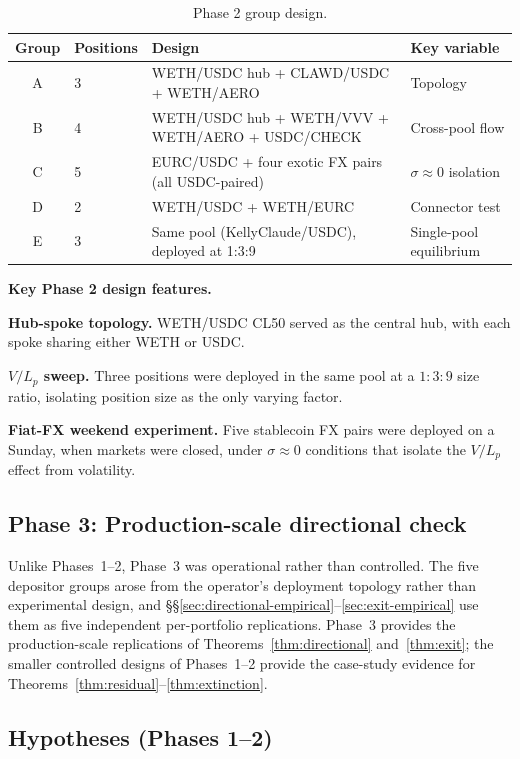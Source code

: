 \documentclass[11pt,a4paper]{article}
\theoremstyle{plain}
\begin{document}
\begin{table}[H]
\centering
\caption{Phase 2 group design.}
\label{tab:phase2-groups}
\setlength{\tabcolsep}{4pt}
\begin{tabular}{@{}clL{9.2cm}l@{}}
\toprule
Group & Positions & Design & Key variable \\
\midrule
A & 3 & WETH/USDC hub + CLAWD/USDC + WETH/AERO & Topology \\
B & 4 & WETH/USDC hub + WETH/VVV + WETH/AERO + USDC/CHECK & Cross-pool flow \\
C & 5 & EURC/USDC + four exotic FX pairs (all USDC-paired) & $\sigma \approx 0$ isolation \\
D & 2 & WETH/USDC + WETH/EURC & Connector test \\
E & 3 & Same pool (KellyClaude/USDC), deployed at 1{:}3{:}9 & Single-pool equilibrium \\
\bottomrule
\end{tabular}
\end{table}

\noindent\textbf{Key Phase 2 design features.}

\textbf{Hub-spoke topology.} WETH/USDC CL50 served as the central hub, with each spoke sharing either WETH or USDC.

\textbf{$V/L_p$ sweep.} Three positions were deployed in the same pool at a $1{:}3{:}9$ size ratio, isolating position size as the only varying factor.

\textbf{Fiat-FX weekend experiment.} Five stablecoin FX pairs were deployed on a Sunday, when markets were closed, under $\sigma \approx 0$ conditions that isolate the $V/L_p$ effect from volatility.

\subsection{Phase 3: Production-scale directional check}\label{sec:phase3}

Unlike Phases~1--2, Phase~3 was operational rather than controlled. The five depositor groups arose from the operator's deployment topology rather than experimental design, and \S\S\ref{sec:directional-empirical}--\ref{sec:exit-empirical} use them as five independent per-portfolio replications. Phase~3 provides the production-scale replications of Theorems~\ref{thm:directional} and~\ref{thm:exit}; the smaller controlled designs of Phases~1--2 provide the case-study evidence for Theorems~\ref{thm:residual}--\ref{thm:extinction}.

\subsection{Hypotheses (Phases 1--2)}\label{sec:hypotheses}
\end{document}
